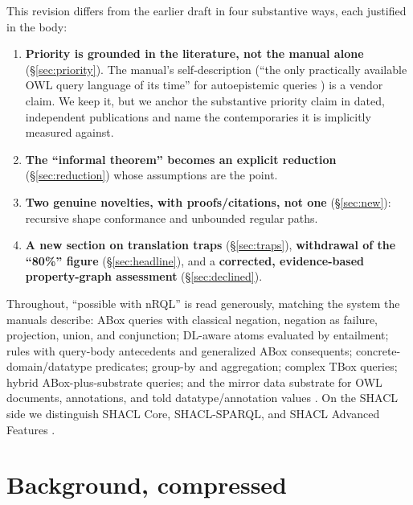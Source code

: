 \documentclass[11pt,letterpaper]{article}
\theoremstyle{definition}
\newcommand{\nrql}{nRQL}
\newcommand{\shacl}{SHACL}
\newcommand{\naf}{negation as failure}
\newcommand{\abox}{ABox}
\newcommand{\tbox}{TBox}
\newcommand{\owl}{OWL}
\begin{document}
This revision differs from the earlier draft in four substantive ways, each justified in the body:
\begin{enumerate}[leftmargin=2em]
  \item \textbf{Priority is grounded in the literature, not the manual alone} (\S\ref{sec:priority}). The manual's self-description (``the only practically available \owl{} query language of its time'' for autoepistemic queries \cite[p.~82]{racerug}) is a vendor claim. We keep it, but we anchor the substantive priority claim in dated, independent publications and name the contemporaries it is implicitly measured against.
  \item \textbf{The ``informal theorem'' becomes an explicit reduction} (\S\ref{sec:reduction}) whose assumptions are the point.
  \item \textbf{Two genuine novelties, with proofs/citations, not one} (\S\ref{sec:new}): recursive shape conformance and unbounded regular paths.
  \item \textbf{A new section on translation traps} (\S\ref{sec:traps}), \textbf{withdrawal of the ``80\%'' figure} (\S\ref{sec:headline}), and a \textbf{corrected, evidence-based property-graph assessment} (\S\ref{sec:declined}).
\end{enumerate}

Throughout, ``possible with \nrql{}'' is read generously, matching the system the manuals describe: \abox{} queries with classical negation, \naf{}, projection, union, and conjunction; DL-aware atoms evaluated by entailment; rules with query-body antecedents and generalized \abox{} consequents; concrete-domain/datatype predicates; group-by and aggregation; complex \tbox{} queries; hybrid \abox{}-plus-substrate queries; and the mirror data substrate for \owl{} documents, annotations, and told datatype/annotation values \cite[pp.~4,\,81--84,\,113--143]{racerug}. On the \shacl{} side we distinguish \shacl{} Core, \shacl{}-SPARQL, and \shacl{} Advanced Features \cite{shacl,shaclaf}.

\section{Background, compressed}\label{sec:background}
\end{document}
